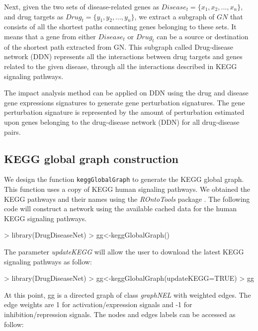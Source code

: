 \documentclass[11pt]{article}
\newcommand{\Rmethod}[1]{{\texttt{#1}}}
\newcommand{\Rpackage}[1]{{\textit{#1}}}
\newcommand{\Rclass}[1]{{\textit{#1}}}
\begin{document}
Next, given the two sets of disease-related genes as
$Disease_t=\{x_1, x_2, ..., x_n\}$, and drug targets as
$Drug_t=\{y_1, y_2, ..., y_n\}$, we extract a subgraph of
$GN$ that consists of all the shortest paths connecting
genes belonging to these sets. It means that a gene from
either $Disease_t$ or $Drug_t$ can be a source or destination
of the shortest path extracted from GN. This subgraph called
Drug-disease network (DDN) represents all the interactions
between drug targets and genes related to the given disease,
through all the interactions described in KEGG signaling pathways.

The impact analysis method \cite{draghici2007systems}
can be applied on DDN using the drug and disease gene
expressions signatures to generate gene perturbation signatures.
The gene perturbation signature is represented by the amount of
perturbation estimated upon genes belonging to the
drug-disease network (DDN) for all drug-disease pairs.

\subsection{KEGG global graph construction }
We design the function \Rmethod{keggGlobalGraph}
to generate the KEGG global graph.
This function uses a copy of KEGG human signaling
pathways. We obtained the KEGG pathways and their
names using the \Rpackage{ROntoTools} package
\cite{voichitaROntoTools}.
The  following code will construct a network using the
available cached data for the human KEGG signaling pathways.
\begin{Schunk}
\begin{Sinput}
> library(DrugDiseaseNet)
> gg<-keggGlobalGraph()
\end{Sinput}
\end{Schunk}

The parameter \textit{updateKEGG} will allow
the user to download the latest KEGG signaling
pathways as follow:

\begin{Schunk}
\begin{Sinput}
> library(DrugDiseaseNet)
> gg<-keggGlobalGraph(updateKEGG=TRUE)
> gg
\end{Sinput}
\end{Schunk}

At this point, gg is a directed graph of class
\Rclass{graphNEL} with weighted edges.
The edge weights are 1 for activation/expression signals
and -1 for inhibition/repression signals.
The nodes and edges labels can be accessed as follow:
\end{document}

